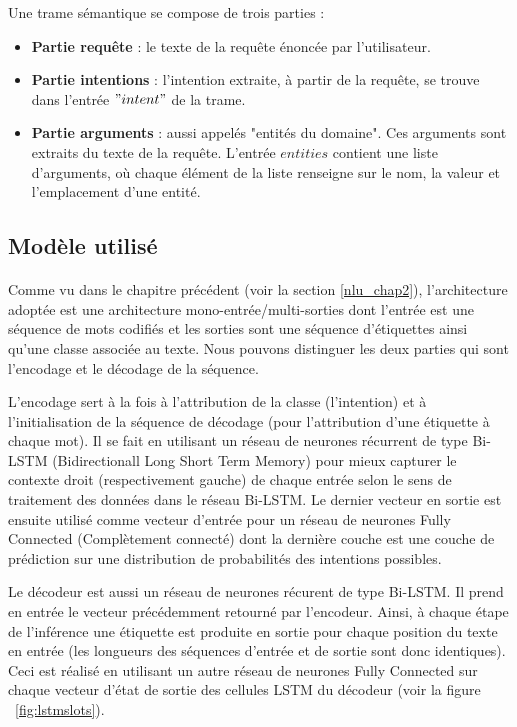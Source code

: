 	\par
	Une trame sémantique se compose de trois parties :
	\begin{itemize}
		\item \textbf{Partie requête} : le texte de la requête énoncée par l'utilisateur.
		\item \textbf{Partie intentions} : l'intention extraite, à partir de la requête, se trouve dans l'entrée $"intent"$ de la trame.
		\item \textbf{Partie arguments} : aussi appelés "entités du domaine". Ces arguments sont extraits du texte de la requête. L'entrée $entities$ contient une liste d'arguments, où chaque élément de la liste renseigne sur le nom, la valeur et l'emplacement d'une entité.
	\end{itemize}
	\subsection{Modèle utilisé}
		\paragraph{}\label{joint_model}
		Comme vu dans le chapitre précédent (voir la section \ref{nlu_chap2}), l'architecture adoptée est une architecture mono-entrée/multi-sorties dont l'entrée est une séquence de mots codifiés et les sorties sont une séquence d'étiquettes ainsi qu'une classe associée au texte. Nous pouvons distinguer les deux parties qui sont l'encodage et le décodage de la séquence. 
		\par L'encodage sert à la fois à l'attribution de la classe (l'intention) et à l'initialisation de la séquence de décodage (pour l'attribution d'une étiquette à chaque mot).
		Il se fait en utilisant un réseau de neurones récurrent de type Bi-LSTM (Bidirectionall Long Short Term Memory) pour mieux capturer le contexte droit (respectivement gauche) de chaque entrée selon le sens de traitement des données dans le réseau Bi-LSTM. Le dernier vecteur en sortie est ensuite utilisé comme vecteur d'entrée pour un réseau de neurones Fully Connected (Complètement connecté) dont la dernière couche est une couche de prédiction sur une distribution de probabilités des intentions possibles.
		\par
		Le décodeur est aussi un réseau de neurones récurent de type Bi-LSTM. Il prend en entrée le vecteur précédemment retourné par l'encodeur. Ainsi, à chaque étape de l'inférence une étiquette est produite en sortie pour chaque position du texte en entrée (les longueurs des séquences d'entrée et de sortie sont donc identiques). Ceci est réalisé en utilisant un autre réseau de neurones Fully Connected sur chaque vecteur d'état de sortie des cellules LSTM du décodeur (voir la figure ~\ref{fig:lstmslots}).

